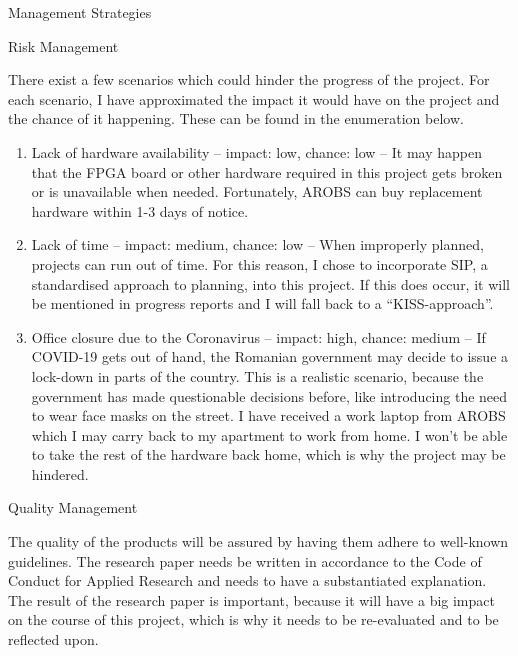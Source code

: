 \documentclass{matthijs}
\begin{document}
	\begin{hoofdstuk}{Management Strategies}

		\begin{paragraaf}{Risk Management}

			There exist a few scenarios which could hinder the progress of the project.
			For each scenario, I have approximated the impact it would have on the project and the chance of it happening.
			These can be found in the enumeration below.

			\begin{enumerate}
				\item Lack of hardware availability -- impact: low, chance: low -- It may happen that the FPGA board or other hardware required in this project gets broken or is unavailable when needed. Fortunately, AROBS can buy replacement hardware within 1-3 days of notice.
				\item Lack of time -- impact: medium, chance: low -- When improperly planned, projects can run out of time. For this reason, I chose to incorporate SIP, a standardised approach to planning, into this project. If this does occur, it will be mentioned in progress reports and I will fall back to a \enquote{KISS-approach}.
				\item Office closure due to the Coronavirus -- impact: high, chance: medium -- If COVID-19 gets out of hand, the Romanian government may decide to issue a lock-down in parts of the country. This is a realistic scenario, because the government has made questionable decisions before, like introducing the need to wear face masks on the street. I have received a work laptop from AROBS which I may carry back to my apartment to work from home. I won't be able to take the rest of the hardware back home, which is why the project may be hindered.
			\end{enumerate}

		\end{paragraaf}
		
		\begin{paragraaf}{Quality Management}

			The quality of the products will be assured by having them adhere to well-known guidelines.
			The research paper needs be written in accordance to the Code of Conduct for Applied Research \cite{andriessen2010gedragscode} and needs to have a substantiated explanation.
			The result of the research paper is important, because it will have a big impact on the course of this project, which is why it needs to be re-evaluated and to be reflected upon.
			

\end{paragraaf}
\end{hoofdstuk}
\end{document}
